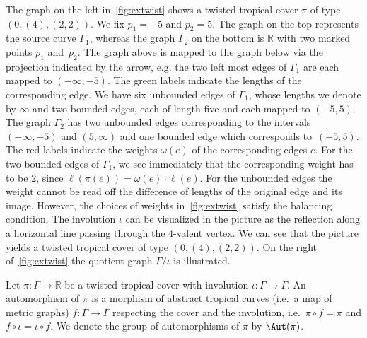 \begin{exam}
The graph on the left in~\cref{fig:extwist} shows a twisted tropical cover $\pi$ of type $(0,(4),(2,2))$. We fix $p_1=-5$ and $p_2=5$. The graph on the top represents the source curve $\Gamma_1$, whereas the graph $\Gamma_2$ on the bottom is $\mathbb{R}$ with two marked points $p_1$ and~$p_2$. The graph above is mapped to the graph below via the projection indicated by the arrow, e.g. the two left most edges of $\Gamma_1$ are each mapped to $(-\infty,-5)$. The green labels indicate the lengths of the corresponding edge. We have six unbounded edges of $\Gamma_1$, whose lengths we denote by $\infty$ and two bounded edges, each of length five and each mapped to $(-5,5)$. The graph $\Gamma_2$ has two unbounded edges corresponding to the intervals $(-\infty,-5)$ and $(5,\infty)$ and one bounded edge which corresponds to~$(-5,5)$. The red labels indicate the weights $\omega(e)$ of the corresponding edges $e$. For the two bounded edges of $\Gamma_1$, we see immediately that the corresponding weight has to be $2$, since $\ell(\pi(e))=\omega(e)\cdot \ell(e)$. For the unbounded edges the weight cannot be read off the difference of lengths of the original edge and its image. However, the choices of weights in~\cref{fig:extwist} satisfy the balancing condition. The involution $\iota$ can be visualized in the picture as the reflection along a horizontal line passing through the $4$-valent vertex. We can see that the picture
yields a twisted tropical cover of type $(0,(4),(2,2))$. On the right of~\cref{fig:extwist} the quotient graph $\Gamma/\iota$ is illustrated.
\end{exam}

\begin{defi}[Automorphisms]
    Let $\pi:\Gamma\rightarrow \mathbb{R}$ be a twisted tropical cover with involution $\iota:\Gamma\rightarrow \Gamma$. An automorphism of $\pi$ is a morphism of abstract tropical curves (i.e.\ a map of metric graphs) $f:\Gamma\rightarrow\Gamma$ respecting the cover and the involution, i.e.\ $\pi\circ f = \pi$ and $f\circ \iota = \iota \circ f$. We denote the group of automorphisms of $\pi$ by $\Aut(\pi)$.
\end{defi}

